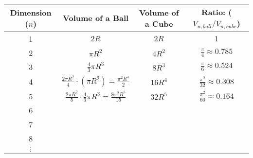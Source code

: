 \begin{center}
    \begin{tabular}{|c|c|c|c|}
        \hline
        Dimension ($n$) & Volume of a Ball & Volume of a Cube & Ratio: ($V_{n,ball} /
        V_{n,cube}$) \\ \hline \hline
        1 & $2R$ & $2R$ & $1$ \\ \hline
        2 & $\pi R^2$ & $4R^2$ & $\frac{\pi}{4} \approx 0.785$ \\ \hline
        3 & $\frac{4}{3} \pi R^3$ & $8R^3$ & $\frac{\pi}{6} \approx 0.524$ \\ \hline
        4 & $\frac{2\pi R^2}{4} \cdot \left( \pi R^2 \right) = \frac{\pi^2 R^4}{2} $ &
        $16R^4$ & $\frac{\pi^2}{32} \approx 0.308$ \\ \hline
        5 & $\frac{2\pi R^2}{5} \cdot \frac{4}{3} \pi R^3 = \frac{8 \pi^2 R^5}{15}$ &
        $32R^5$ & $\frac{\pi^2}{60} \approx 0.164$ \\ \hline
        6 &  &  &  \\ \hline
        7 &  &  &  \\ \hline
        8 &  &  &  \\ \hline
        $\vdots$ &  &  &  \\ \hline
    \end{tabular}
\end{center}

